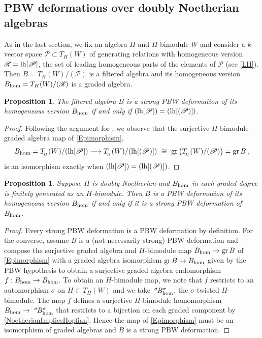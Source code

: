 \documentclass[11pt]{amsart}
\numberwithin{equation}{section}
\newtheorem{prop}[equation]{Proposition}
\DeclareMathOperator{\gr}{gr}
\newcommand{\BBB}{B}
\newcommand{\RR}{\mathscr{R} }
\newcommand{\PP}{\mathscr{P}}
\newcommand{\LH}{{\rm{lh}}}
\newcommand{\hh}{\rm{hom}}
\newcommand{\s}{\sigma}
\renewcommand{\_}[1]{\mbox{$_{\left( #1 \right)}$}}
\begin{document}
{ \subsection*{PBW deformations over doubly Noetherian algebras}
 As in the last section, we fix an algebra $H$ and $H$-bimodule $W$
 and consider a $k$-vector space 
 $\PP\subset T_{H}(W)$ of generating relations
 with homogeneous version $\RR=\LH[\PP]$,
    the set of leading homogeneous parts of the elements of $\PP$
    (see \cref{LH}).
    Then $\BBB=T_{H}(W)/(\PP)$ is a filtered algebra and
    its homogeneous version $\BBB_{\hh}=T_{H}(W)/(\RR)$
    is a graded algebra.


\begin{prop}\label{PBWImpliesLH}
The filtered algebra $\BBB$ 
is a strong PBW deformation
of  its homogeneous version $\BBB_{\hh}$ if and only if
$(\LH[\PP])=(\LH[(\PP)])$.
\end{prop}
\begin{proof}
  Following the argument for \cite[Proposition 1.7]{Li},
  we observe that the
  surjective $H$-bimodule 
  graded algebra map of
  \cref{Epimorphism},
 \begin{equation*}%
  \BBB_{\hh}=
T_{\! _H}(W)/ (\LH[\PP])
\longrightarrow
T_{\! _H}(W)/ (\LH[(\PP)])
\ \cong\  \gr\big(T_{\! _H}(W)/(\PP) \big)
=\gr \BBB 
\, ,
\end{equation*}
is an isomorphism 
exactly when
$(\LH[\PP])=(\LH[(\PP)])$.
\end{proof}

\begin{prop}\label{prop:doubly-PBW}
  Suppose $H$ is doubly Noetherian
 and
$\BBB_{\hh}$ in each graded degree
is finitely generated as an $H$-bimodule.
Then $\BBB$ is a PBW deformation of
its
homogeneous version $\BBB_{\hh}$ if and only if it is a strong PBW deformation
of $\BBB_{\hh}$.   
\end{prop}
\begin{proof}
Every strong PBW deformation is
a PBW deformation by definition.
For the converse, assume $\BBB$ is a (not necessarily strong) PBW deformation and
compose the surjective graded algebra and $H$-bimodule map
  $\BBB_{\hh}\rightarrow \gr \BBB $
  of \cref{Epimorphism}
  with a graded algebra isomorphism
  $\gr \BBB \rightarrow \BBB_{\hh}$ given by the PBW hypothesis
  to obtain a surjective graded algebra endomorphism
  $f:\BBB_{\hh}\rightarrow \BBB_{\hh}$.
  To obtain an $H$-bimodule map, 
  we note that $f$
  restricts to an automorphism
  $\sigma$
  on $H\subset T_H(W)$ and we take
  $\, ^{\s\!} \BBB_{\hh}^{\s}$, the $\s$-twisted $H$-bimodule.  The map $f$ defines 
  a surjective $H$-bimodule homomorphism 
  $\BBB_{\hh} \rightarrow \, ^{\, \s\!}\BBB_{\hh}
  ^{\s}$ 
that restricts to a bijection on each graded component
    by \cref{NoetherianImpliesHopfian}.
  Hence
  the map of \cref{Epimorphism} must be an isomorphism of graded
  algebras and $B$ is a strong PBW deformation.
\end{proof}

}
\end{document}
